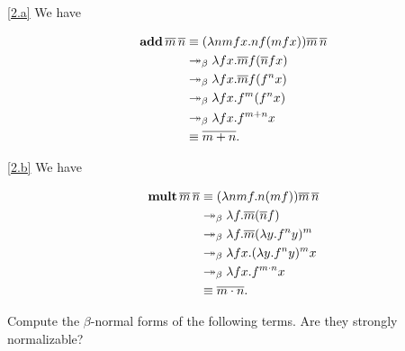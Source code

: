 \documentclass{homework}
\begin{document}
\begin{solution}
  
    \ref{2.a} We have

    \begin{align*}
      \mathbf{add}\, \overline{m}\, \overline{n} &\equiv (\lambda nmfx.nf(mfx))\overline{m}\,\overline{n} \\
      &\twoheadrightarrow_{\beta} \lambda fx.\overline{m}f(\overline{n}fx) \\
      &\twoheadrightarrow_{\beta} \lambda fx.\overline{m}f(f^{n}x) \\
      &\twoheadrightarrow_{\beta} \lambda fx.f^{m}(f^{n}x) \\
      &\twoheadrightarrow_{\beta} \lambda fx.f^{m+n}x \\
      &\equiv \overline{m+n}.
    \end{align*}
  
    \ref{2.b} We have

    \begin{align*}
      \mathbf{mult}\, \overline{m}\, \overline{n} &\equiv (\lambda nmf.n(mf))\overline{m}\,\overline{n} \\
      &\twoheadrightarrow_{\beta} \lambda f.\overline{m}(\overline{n}f) \\
      &\twoheadrightarrow_{\beta} \lambda f.\overline{m}(\lambda y.f^n y)^m \\
      &\twoheadrightarrow_{\beta} \lambda fx.(\lambda y.f^n y)^m x \\
      &\twoheadrightarrow_{\beta} \lambda fx.f^{m\cdot n}x \\
      &\equiv \overline{m\cdot n}.
    \end{align*}

\end{solution}

\begin{problem}
  Compute the \(\beta\)-normal forms of the following terms.
  Are they strongly normalizable?
\end{problem}
\end{document}
